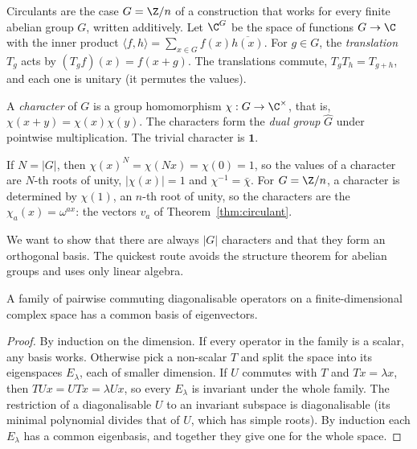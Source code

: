 Circulants are the case $G=\Z/n$ of a construction that works for every finite abelian group $G$, written additively. Let $\C^G$
be the space of functions $G\to\C$ with the inner product $\langle f,h\rangle=\sum_{x\in G}f(x)\overline{h(x)}$. For $g\in G$, the
\emph{translation} $T_g$ acts by $(T_gf)(x)=f(x+g)$. The translations commute, $T_gT_h=T_{g+h}$, and each one is unitary (it
permutes the values).

\begin{definition}\label{def:character}
A \emph{character} of $G$ is a group homomorphism $\chi:G\to\C^\times$, that is, $\chi(x+y)=\chi(x)\chi(y)$. The characters form
the \emph{dual group} $\widehat G$ under pointwise multiplication. The trivial character is $\mathbf 1$.
\end{definition}

If $N=|G|$, then $\chi(x)^N=\chi(Nx)=\chi(0)=1$, so the values of a character are $N$-th roots of unity, $|\chi(x)|=1$ and
$\chi^{-1}=\bar\chi$. For $G=\Z/n$, a character is determined by $\chi(1)$, an $n$-th root of unity, so the characters are the
$\chi_a(x)=\omega^{ax}$: the vectors $v_a$ of Theorem~\ref{thm:circulant}.

We want to show that there are always $|G|$ characters and that they form an orthogonal basis. The quickest route avoids the
structure theorem for abelian groups and uses only linear algebra.

\begin{lemma}\label{lem:commuting}
A family of pairwise commuting diagonalisable operators on a finite-dimensional complex space has a common basis of eigenvectors.
\end{lemma}
\begin{proof}
By induction on the dimension. If every operator in the family is a scalar, any basis works. Otherwise pick a non-scalar $T$
and split the space into its eigenspaces $E_\lambda$, each of smaller dimension. If $U$ commutes with $T$ and $Tx=\lambda x$,
then $TUx=UTx=\lambda Ux$, so every $E_\lambda$ is invariant under the whole family. The restriction of a diagonalisable $U$ to an
invariant subspace is diagonalisable (its minimal polynomial divides that of $U$, which has simple roots). By induction each
$E_\lambda$ has a common eigenbasis, and together they give one for the whole space.
\end{proof}

